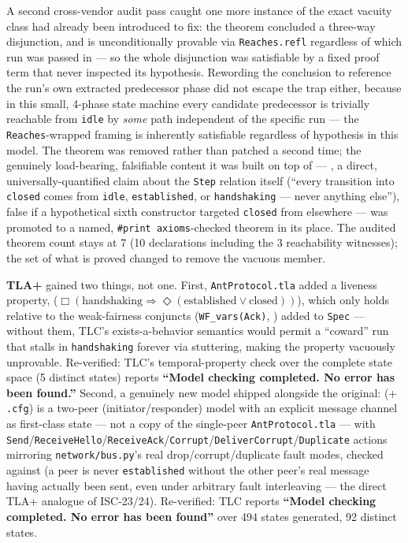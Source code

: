 \documentclass[
  english,
]{article}
\theoremstyle{definition}
\begin{document}
A second cross-vendor audit pass caught one more instance of the exact
vacuity class  had already
been introduced to fix: the theorem
 concluded a three-way
disjunction, and  is unconditionally
provable via \texttt{Reaches.refl} regardless of which run was passed in
--- so the whole disjunction was satisfiable by a fixed proof term that
never inspected its hypothesis. Rewording the conclusion to reference
the run's own extracted predecessor phase did not escape the trap
either, because in this small, 4-phase state machine every candidate
predecessor is trivially reachable from \texttt{idle} by \emph{some}
path independent of the specific run --- the \texttt{Reaches}-wrapped
framing is inherently satisfiable regardless of hypothesis in this
model. The theorem was removed rather than patched a second time; the
genuinely load-bearing, falsifiable content it was built on top of ---
, a direct, universally-quantified claim
about the \texttt{Step} relation itself (``every transition into
\texttt{closed} comes from \texttt{idle}, \texttt{established}, or
\texttt{handshaking} --- never anything else''), false if a hypothetical
sixth constructor targeted \texttt{closed} from elsewhere --- was
promoted to a named, \texttt{\#print\ axioms}-checked theorem in its
place. The audited theorem count stays at 7 (10 declarations including
the 3 reachability witnesses); the set of what is proved changed to
remove the vacuous member.

\textbf{TLA+} gained two things, not one. First,
\texttt{AntProtocol.tla} added a liveness property,
(\(\Box(\text{handshaking} \Rightarrow \Diamond(\text{established} \lor
\text{closed}))\)), which only holds relative to the weak-fairness
conjuncts (\texttt{WF\_vars(Ack)}, ) added to
\texttt{Spec} --- without them, TLC's exists-a-behavior semantics would
permit a ``coward'' run that stalls in \texttt{handshaking} forever via
stuttering, making the property vacuously unprovable. Re-verified: TLC's
temporal-property check over the complete state space (5 distinct
states) reports \textbf{``Model checking completed. No error has been
found.''} Second, a genuinely new model shipped alongside the original:
 (+ \texttt{.cfg}) is a two-peer
(initiator/responder) model with an explicit message channel as
first-class state --- not a copy of the single-peer
\texttt{AntProtocol.tla} --- with
\texttt{Send}/\texttt{ReceiveHello}/\texttt{ReceiveAck}/\texttt{Corrupt}/\texttt{DeliverCorrupt}/\texttt{Duplicate}
actions mirroring \texttt{network/bus.py}'s real drop/corrupt/duplicate
fault modes, checked against  (a peer is
never \texttt{established} without the other peer's real message having
actually been sent, even under arbitrary fault interleaving --- the
direct TLA+ analogue of ISC-23/24). Re-verified: TLC reports
\textbf{``Model checking completed. No error has been found''} over 494
states generated, 92 distinct states.
\end{document}
